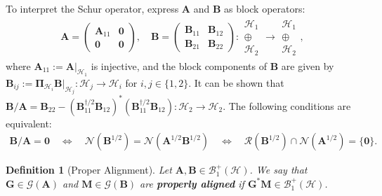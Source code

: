 \documentclass[noinfoline]{imsart}\setcounter{tocdepth}{2}
\newcommand{\m}[1]{\mathbf{#1}}
\renewcommand{\c}[1]{\mathcal{#1}}
\theoremstyle{plain}
\newtheorem{definition}{Definition}[section]
\begin{document}
To interpret the Schur operator, express $\m{A}$ and $\m{B}$ as block operators:
\begin{align*}
    \m{A} =
    \begin{pmatrix}
    \m{A}_{{11}} & \m{0} \\
    \m{0} & \m{0}
    \end{pmatrix},
    \quad
    \m{B} =
    \begin{pmatrix}
    \m{B}_{{11}} & \m{B}_{{12}} \\
    \m{B}_{{21}} & \m{B}_{{22}}
    \end{pmatrix}
        :
    \begin{array}{c}
    \c{H}_{1} \\
    \oplus \\
    \c{H}_{2}
    \end{array}
    \rightarrow
    \begin{array}{c}
    \c{H}_{1} \\
    \oplus \\
    \c{H}_{2}
    \end{array},
\end{align*}
where $\m{A}_{{11}} := \m{A} \big|_{\c{H}_{1}}$ is injective, and the block components of $\m{B}$ are given by $\m{B}_{{ij}} := \m{\Pi}_{\c{H}_{i}} \m{B} \big|_{\c{H}_{j}}: \c{H}_{j} \to \c{H}_{i}$ for $i, j \in \{1, 2\}$. It can be shown that $\m{B} / \m{A} = \m{B}_{{22}} - (\m{B}_{{11}}^{\dagger/2} \m{B}_{{12}})^{*} (\m{B}_{{11}}^{\dagger/2} \m{B}_{{12}}): \c{H}_{2} \to \c{H}_{2}$. The following conditions are equivalent:
\begin{align*}
    \m{B}/\m{A} = \m{0} \quad \Longleftrightarrow \quad \c{N} (\m{B}^{1/2}) = \c{N}(\m{A}^{1/2} \m{B}^{1/2}) \quad \Longleftrightarrow \quad \c{R}(\m{B}^{1/2}) \cap \c{N}(\m{A}^{1/2}) = \{ \m{0} \}.
\end{align*}

\begin{definition}[Proper Alignment]
Let $\m{A}, \m{B} \in \c{B}_{1}^{+}(\c{H})$. We say that $\m{G} \in \c{G}(\m{A})$ and $\m{M} \in \c{G}(\m{B})$ are \textbf{properly aligned} if $\m{G}^{*} \m{M} \in \c{B}_{1}^{+}(\c{H})$.
\end{definition}
\end{document}
